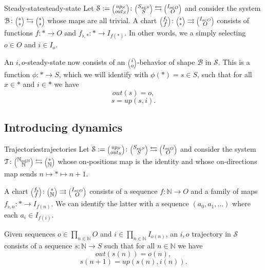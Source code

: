 \documentclass[12pt, a4paper]{article}
\theoremstyle{definition}
\theoremstyle{plain}
\theoremstyle{plain}
\theoremstyle{plain}
\theoremstyle{plain}
\theoremstyle{plain}
\theoremstyle{remark}
\theoremstyle{remark}
\newcommand{\mc}[1]{\mathcal{#1}}
\newcommand{\lens}[2]{\scaleobj{0.6}{\begin{pmatrix} \scaleobj{1.3}{{#1}} \\ \scaleobj{1.3}{{#2}} \end{pmatrix}}}
\begin{document}
\begin{tcdefinition}{Steady-state}{steady-state}
	Let $\mc{S} := \lens{up_S}{out_S} \colon \lens{S_{s \in S}}{S} \leftrightarrows \lens{I_{o \in O}}{O}$ and consider the system $\mc{B} \colon \lens{*}{*} \leftrightarrows \lens{*}{*}$ whose maps are all trivial. A chart $\lens{f_\flat}{f} \colon \lens{*}{*} \rightrightarrows \lens{I_{o \in O}}{O}$ consists of functions $f \colon * \rightarrow O$ and $f_{\flat,*} \colon * \rightarrow I_{f(*)}$. In other words, we a simply selecting $o \in O$ and $i \in I_o$. 

	An $i,o$-steady-state now consists of an $\lens{i}{o}$-behavior of shape $\mc{B}$ in $\mc{S}$. This is a function $\phi \colon * \rightarrow S$, which we will identify with $\phi(*) = s \in S$, such that for all $x \in *$ and $i \in *$ we have
	$$out(s) = o, $$
	$$s = up(s,i).$$
\end{tcdefinition}

\subsection{Introducing dynamics}

\begin{tcdefinition}{Trajectories}{trajectories}
	Let $\mc{S} := \lens{up_S}{out_S} \colon \lens{S_{s \in S}}{S} \leftrightarrows \lens{I_{o \in O}}{O}$ and consider the system $\mc{T} \colon \lens{\mathbb{N}_{n \in \mathbb{N}}}{\mathbb{N}} \leftrightarrows \lens{*}{\mathbb{N}}$ whose on-positions map is the identity and whose on-directions map sends $n \mapsto * \mapsto n+1$.

	A chart $\lens{f_\flat}{f} \colon \lens{*}{\mathbb{N}} \rightrightarrows \lens{I_{o \in O}}{O}$ consists of a sequence $f \colon \mathbb{N} \rightarrow O$ and a family of maps $f_{\flat,n} \colon * \rightarrow I_{f(n)}$. We can identify the latter with a sequence $(a_0, a_1, \ldots)$ where each $a_i \in I_{f(i)}$.

	Given sequences $o \in \prod_{n \in \mathbb{N}} O$ and $i \in \prod_{n \in \mathbb{N}} I_{o(n)}$, an $i,o$ trajectory in $\mc{S}$ consists of a sequence $s \colon \mathbb{N} \rightarrow S$ such that for all $n \in \mathbb{N}$ we have
	$$out(s(n)) = o(n), $$
	$$s(n+1) = up(s(n), i(n)).$$
\end{tcdefinition}
\end{document}
